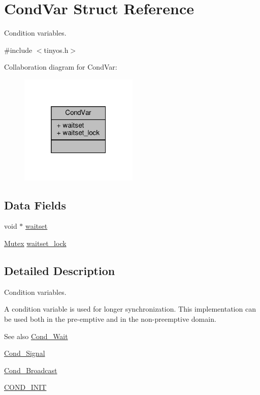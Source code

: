 \hypertarget{structCondVar}{}\section{Cond\+Var Struct Reference}
\label{structCondVar}


Condition variables.  




{\ttfamily \#include $<$tinyos.\+h$>$}



Collaboration diagram for Cond\+Var\+:
\nopagebreak
\begin{figure}[H]
\begin{center}
\leavevmode
\includegraphics[width=160pt]{structCondVar__coll__graph}
\end{center}
\end{figure}
\subsection*{Data Fields}
\begin{DoxyCompactItemize}
\item 
void $\ast$ \hyperlink{structCondVar_a7da9e0169713c3b3ae386a8ab49f7e34}{waitset}
\item 
\hyperlink{group__syscalls_gaef2ec62cae8e0031fd19fc8b91083ade}{Mutex} \hyperlink{structCondVar_a477b855f4d3880d231206ae79bd5b6cf}{waitset\+\_\+lock}
\end{DoxyCompactItemize}


\subsection{Detailed Description}
Condition variables. 

A condition variable is used for longer synchronization. This implementation can be used both in the pre-\/emptive and in the non-\/preemptive domain.

\begin{DoxySeeAlso}{See also}
\hyperlink{group__syscalls_ga970dca2210b3f2ec8aedab7f542a9bf4}{Cond\+\_\+\+Wait} 

\hyperlink{group__syscalls_ga43f64f8be273d2fe77d7de5f4b81e22d}{Cond\+\_\+\+Signal} 

\hyperlink{group__syscalls_ga8196aa2a48cad90742f254cc3b8fd351}{Cond\+\_\+\+Broadcast} 

\hyperlink{group__syscalls_ga6a7055a466bff255172e05f6ec82d792}{C\+O\+N\+D\+\_\+\+I\+N\+IT} 
\end{DoxySeeAlso}



